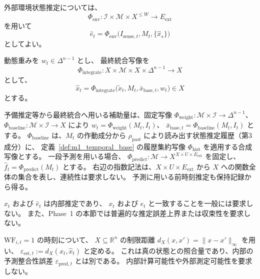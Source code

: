 外部環境状態推定については、
\[
  \Phi_{\mathrm{env}}:
  \mathcal I\times\mathcal M\times X^{\le W}
  \to E_{\mathrm{ext}}
\]
を用いて
\[
  \hat e_t
  =
  \Phi_{\mathrm{env}}
  \bigl(
    I_{\mathrm{sense},t},
    M_t,
    \{\hat x_s\}
  \bigr)
\]
としてよい。

\begin{definition}
\label{def:m1_integration}
動態重みを $w_t\in\Delta^{n-1}$ とし、
最終統合写像を
\[
  \Phi_{\mathrm{integrate}}:
  X\times\mathcal M\times X\times\Delta^{n-1}
  \to X
\]
として、
\[
  \hat x_t
  =
  \Phi_{\mathrm{integrate}}
  \bigl(
    \tilde x_t,
    M_t,
    \bar x_{\mathrm{base},t},
    w_t
  \bigr)
  \in X
\]
とする。
\end{definition}
\begin{definition}
\label{def:s4_m1_sources}
予備推定等から最終統合へ用いる補助量は、固定写像
$\Phi_{\mathrm{weight}}:\mathcal M\times\mathcal I\to\Delta^{n-1}$、
$\Phi_{\mathrm{baseline}}:\mathcal M\times\mathcal I\to X$ により
$w_t=\Phi_{\mathrm{weight}}(M_t,I_t)$、
$\bar x_{\mathrm{base},t}=\Phi_{\mathrm{baseline}}(M_t,I_t)$ とする。
$\Phi_{\mathrm{baseline}}$ は、$M_t$ の作動成分から $\rho_{\mathrm{past}}$ により読み出す状態推定履歴（第3成分）に、
定義~\ref{def:m1_temporal_base} の履歴集約写像 $\Phi_{\mathrm{hist}}$ を適用する合成写像とする。
一段予測を用いる場合、
$\Phi_{\mathrm{predict}}:\mathcal M\to X^{X\times U\times E_{\mathrm{ext}}}$
を固定し、$\hat f_t=\Phi_{\mathrm{predict}}(M_t)$ とする。
右辺の指数記法は、$X\times U\times E_{\mathrm{ext}}$ から $X$ への関数全体の集合を表し、連続性は要求しない。
予測に用いる前時刻推定も保持記録から得る。
\end{definition}


\begin{remark}[状態・環境推定と実現値]
\label{rem:m1_estimate_nontruth}
$\hat x_t$ および $\hat e_t$ は内部推定であり、
$x_t$ および $e_t$ と一致することを一般には要求しない。
また、Phase~1 の本節では普遍的な推定誤差上界または収束性を要求しない。
\end{remark}
\begin{definition}
\label{def:s4_state_estimation_error}
$\mathrm{WF}_{i,t}=1$ の時刻について、
$X\subseteq\mathbb R^n$ の制限距離 $d_X(x,x')=\|x-x'\|_\infty$ を用い、
$\varepsilon_{\mathrm{est},t}:=d_X(x_t,\hat x_t)$ と定める。
これは真の状態との照合量であり、内部の予測整合性誤差
$\varepsilon_{\mathrm{pred},t}$ とは別である。
内部計算可能性や外部測定可能性を要求しない。
\end{definition}


